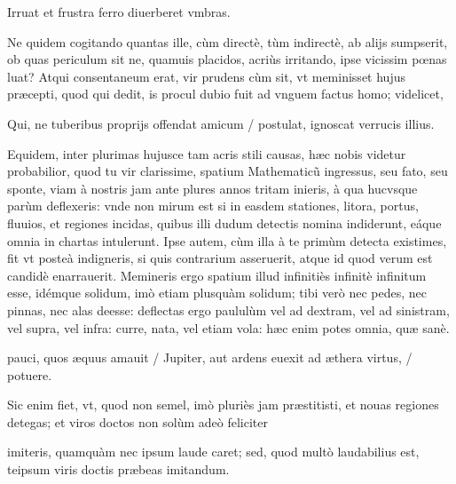 \documentclass[11pt,a4paper]{article}
\begin{document}
Irruat et frustra ferro diuerberet vmbras.

Ne quidem cogitando quantas ille, cùm directè, tùm indirectè, ab alijs sumpserit, ob quas periculum sit ne, quamuis placidos, acriùs irritando, ipse vicissim pœnas luat? Atqui consentaneum erat, vir prudens cùm sit, vt meminisset hujus præcepti, quod qui dedit, is procul dubio fuit ad vnguem factus homo; videlicet,

Qui, ne tuberibus proprijs offendat amicum / postulat, ignoscat verrucis illius.

Equidem, inter plurimas hujusce tam acris stili causas, hæc nobis videtur probabilior, quod tu vir clarissime, spatium Mathematicũ ingressus, seu fato, seu sponte, viam à nostris jam ante plures annos tritam inieris, à qua hucvsque parùm deflexeris: vnde non mirum est si in easdem stationes, litora, portus, fluuios, et regiones incidas, quibus illi dudum detectis nomina indiderunt, eáque omnia in chartas intulerunt. Ipse autem, cùm illa à te primùm detecta existimes, fit vt posteà indigneris, si quis contrarium asseruerit, atque id quod verum est candidè enarrauerit. Memineris ergo spatium illud infinitiès infinitè infinitum esse, idémque solidum, imò etiam plusquàm solidum; tibi verò nec pedes, nec pinnas, nec alas deesse: deflectas ergo paululùm vel ad dextram, vel ad sinistram, vel supra, vel infra: curre, nata, vel etiam vola: hæc enim potes omnia, quæ sanè.

pauci, quos æquus amauit / Jupiter, aut ardens euexit ad æthera virtus, / potuere.

Sic enim fiet, vt, quod non semel, imò pluriès jam præstitisti, et nouas regiones detegas; et viros doctos non solùm adeò feliciter


imiteris, quamquàm nec ipsum laude caret; sed, quod multò laudabilius est, teipsum viris doctis præbeas imitandum.
\end{document}
